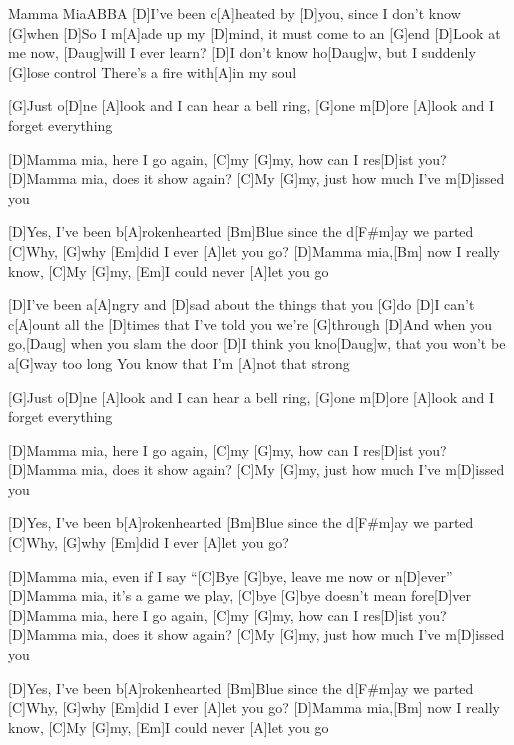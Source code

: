\documentclass[../main.tex]{subfiles}
\begin{document}
\begin{song}{Mamma Mia}{ABBA}{}
[D]I've been c[A]heated by [D]you, since I don't know [G]when
[D]So I m[A]ade up my [D]mind, it must come to an [G]end
[D]Look at me now, [Daug]will I ever learn?
[D]I don't know ho[Daug]w, but I suddenly [G]lose control
There's a fire with[A]in my soul

[G]Just o[D]ne  [A]look and I can hear a bell ring, [G]one m[D]ore [A]look and I forget everything

[D]Mamma mia, here I go again, [C]my [G]my, how can I res[D]ist you?
[D]Mamma mia, does it show again? [C]My [G]my, just how much I've m[D]issed you

[D]Yes, I've been b[A]rokenhearted
[Bm]Blue since the d[F#m]ay we parted
[C]Why, [G]why [Em]did I ever [A]let you go?
[D]Mamma mia,[Bm] now I really know,
[C]My   [G]my, [Em]I could never [A]let you go

[D]I've been a[A]ngry and [D]sad about the things that you [G]do
[D]I can't c[A]ount all the [D]times that I've told you we're [G]through
[D]And when you go,[Daug] when you slam the door
[D]I think you kno[Daug]w, that you won't be a[G]way too long
You know that I'm [A]not that strong

[G]Just o[D]ne  [A]look and I can hear a bell ring, [G]one m[D]ore [A]look and I forget everything

[D]Mamma mia, here I go again, [C]my [G]my, how can I res[D]ist you?
[D]Mamma mia, does it show again? [C]My [G]my, just how much I've m[D]issed you

[D]Yes, I've been b[A]rokenhearted
[Bm]Blue since the d[F#m]ay we parted
[C]Why, [G]why [Em]did I ever [A]let you go?

[D]Mamma mia, even if I say ``[C]Bye [G]bye, leave me now or n[D]ever''
[D]Mamma mia, it's a game we play, [C]bye [G]bye doesn't mean fore[D]ver
[D]Mamma mia, here I go again, [C]my [G]my, how can I res[D]ist you?
[D]Mamma mia, does it show again? [C]My [G]my, just how much I've m[D]issed you

[D]Yes, I've been b[A]rokenhearted
[Bm]Blue since the d[F#m]ay we parted
[C]Why, [G]why [Em]did I ever [A]let you go?
[D]Mamma mia,[Bm] now I really know,
[C]My   [G]my, [Em]I could never [A]let you go

\end{song}
\end{document}
